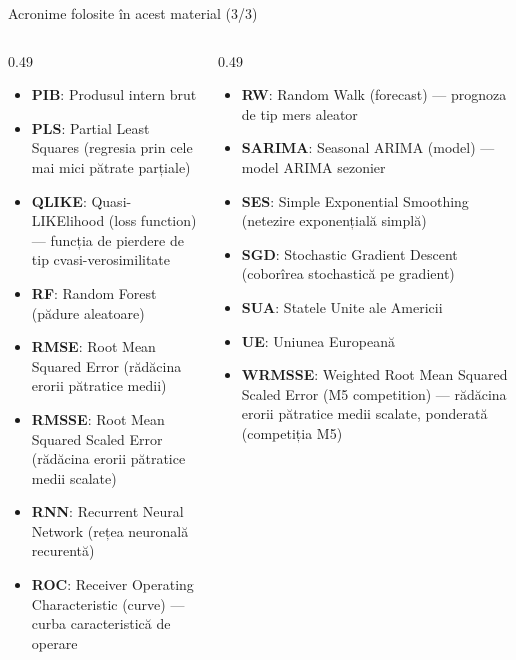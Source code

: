 \begin{frame}{Acronime folosite în acest material (3/3)}
\begin{columns}[T]
\begin{column}{0.49\textwidth}
\begin{itemize}\setlength{\itemsep}{0pt}
    \item \textbf{PIB}: Produsul intern brut
    \item \textbf{PLS}: Partial Least Squares (regresia prin cele mai mici pătrate parțiale)
    \item \textbf{QLIKE}: Quasi-LIKElihood (loss function) — funcția de pierdere de tip cvasi-verosimilitate
    \item \textbf{RF}: Random Forest (pădure aleatoare)
    \item \textbf{RMSE}: Root Mean Squared Error (rădăcina erorii pătratice medii)
    \item \textbf{RMSSE}: Root Mean Squared Scaled Error (rădăcina erorii pătratice medii scalate)
    \item \textbf{RNN}: Recurrent Neural Network (rețea neuronală recurentă)
    \item \textbf{ROC}: Receiver Operating Characteristic (curve) — curba caracteristică de operare
\end{itemize}
\end{column}
\begin{column}{0.49\textwidth}
\begin{itemize}\setlength{\itemsep}{0pt}
    \item \textbf{RW}: Random Walk (forecast) — prognoza de tip mers aleator
    \item \textbf{SARIMA}: Seasonal ARIMA (model) — model ARIMA sezonier
    \item \textbf{SES}: Simple Exponential Smoothing (netezire exponențială simplă)
    \item \textbf{SGD}: Stochastic Gradient Descent (coborîrea stochastică pe gradient)
    \item \textbf{SUA}: Statele Unite ale Americii
    \item \textbf{UE}: Uniunea Europeană
    \item \textbf{WRMSSE}: Weighted Root Mean Squared Scaled Error (M5 competition) — rădăcina erorii pătratice medii scalate, ponderată (competiția M5)
\end{itemize}
\end{column}
\end{columns}
\end{frame}

